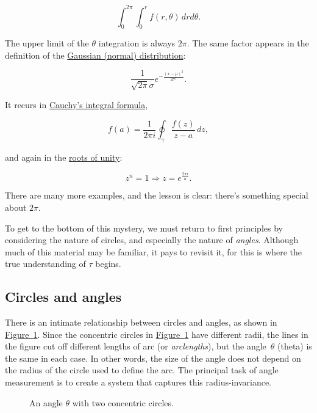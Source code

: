 \documentclass{article}
\begin{document}
\[
  \int_0^{2\pi}\int_0^r f(r, \theta)\, dr d\theta.
\]

\noindent The upper limit of the $\theta$ integration is always $2\pi$. The same factor appears in the definition of the \href{http://en.wikipedia.org/wiki/Normal_distribution}{Gaussian (normal) distribution}:

\[
  \frac{1}{\sqrt{2\pi}\sigma}e^{-\frac{(x-\mu)^2}{2\sigma^2}}.
\]

\noindent It recurs in \href{http://en.wikipedia.org/wiki/Cauchy's_integral_formula}{Cauchy's integral formula},

\[
  f(a) = \frac{1}{2\pi i}\oint_\gamma\frac{f(z)}{z-a}\,dz,
\]

\noindent and again in the \href{http://en.wikipedia.org/wiki/Root_of_unity}{roots of unity}:

\[
  z^n = 1 \Rightarrow z = e^\frac{2\pi i}{n}.
\]

\noindent There are many more examples, and the lesson is clear: there's something special about $2\pi$.

To get to the bottom of this mystery, we must return to first principles by considering the nature of circles, and especially the nature of \emph{angles}. Although much of this material may be familiar, it pays to revisit it, for this is where the true understanding of $\tau$ begins.

  \subsection{Circles and angles} %
  \label{sec:circles_and_angles}

There is an intimate relationship between circles and angles, as shown in \hyperref[fig:angle-arclength]{Figure~}\ref{fig:angle-arclength}. Since the concentric circles in \hyperref[fig:angle-arclength]{Figure~}\ref{fig:angle-arclength} have different radii, the lines in the figure cut off different lengths of arc (or \emph{arclengths}), but the angle~$\theta$ (theta) is the same in each case. In other words, the size of the angle does not depend on the radius of the circle used to define the arc. The principal task of angle measurement is to create a system that captures this radius-invariance.

\begin{figure}
\begin{center}
\end{center}
\caption{An angle $\theta$ with two concentric circles.\label{fig:angle-arclength}}
\end{figure}
\end{document}
